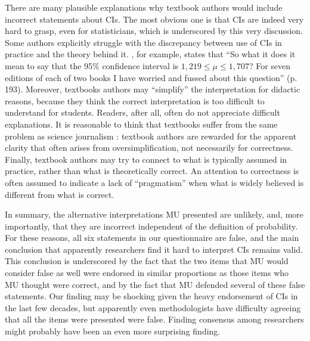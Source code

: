 \documentclass[jou,a4paper,floatsintext,draftfirst]{apa6}\usepackage[]{graphicx}\usepackage[]{color}
\begin{document}
There are many plausible explanations why textbook authors would include incorrect statements about CIs. The most obvious one is that CIs are indeed very hard to grasp, even for statisticians, which is underscored by this very discussion. Some authors explicitly struggle with the discrepancy between use of CIs in practice and the theory behind it. \citet{Howell:2013}, for example, states that ``So what it does it mean to say that the 95\% confidence interval is $1,219 \leq \mu \leq 1,707$? For seven editions of each of two books I have worried and fussed about this question'' (p. 193). Moreover, textbooks authors may ``simplify'' the interpretation for didactic reasons, because they think the correct interpretation is too difficult to understand for students. Readers, after all, often do not appreciate difficult explanations. It is reasonable to think that textbooks suffer from the same problem as science journalism \citep{Ransohoff:Ransohoff:2001}: textbook authors are rewarded for the apparent clarity that often arises from oversimplification, not necessarily for correctness. Finally, textbook authors may try to connect to what is typically assumed in practice, rather than what is theoretically correct. An attention to correctness is often assumed to indicate a lack of ``pragmatism'' when what is widely believed is different from what is correct.

	In summary, the alternative interpretations MU presented are unlikely, and, more importantly, that they are incorrect independent of the definition of probability. For these reasons, all six statements in our questionnaire are false, and the main conclusion that apparently researchers find it hard to interpret CIs remains valid. This conclusion is underscored by the fact that the two items that MU would consider false as well were endorsed in similar proportions as those items who MU thought were correct, and by the fact that MU defended several of these false statements. Our finding may be shocking given the heavy endorsement of CIs in the last few decades, but apparently even methodologists have difficulty agreeing that all the items were presented were false. Finding consensus among researchers might probably have been an even more surprising finding.

\printbibliography
\end{document}
